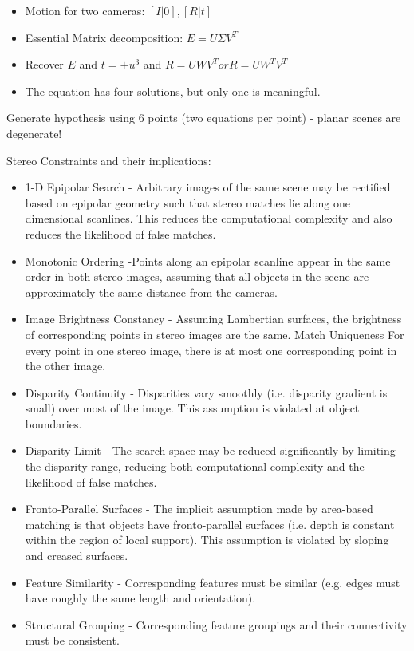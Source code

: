 \begin{enumerate}
\begin{itemize}
\item  Motion for two cameras: $[I|0], [R|t]$
\item Essential Matrix decomposition: $E= U \Sigma V^T$
\item Recover $E$ and $t = \pm u^3$ and $R=UWV^T or R=UW^TV^T$
\item The equation has four solutions, but only one is meaningful. 
\end{itemize}


Generate hypothesis using 6 points (two equations per point) - planar scenes are degenerate!

Stereo Constraints and their implications:
\begin{itemize}
\item 1-D Epipolar Search -  Arbitrary images of the same scene may be rectified based on epipolar geometry such that stereo matches lie along one dimensional scanlines. This reduces the computational complexity
and also reduces the likelihood of false matches.
\item Monotonic Ordering  -Points along an epipolar scanline appear in the same order in both stereo images, assuming that all objects in the scene are approximately the same distance from the cameras.
\item Image Brightness Constancy - Assuming Lambertian surfaces, the brightness of corresponding
points in stereo images are the same.
Match Uniqueness For every point in one stereo image, there is at most one corresponding point in the other image.
\item Disparity Continuity - Disparities vary smoothly (i.e. disparity gradient is small) over most of the image. This assumption is violated at object boundaries.
\item Disparity Limit - The search space may be reduced significantly by limiting the disparity range, reducing both computational complexity and the likelihood of false matches.
\item Fronto-Parallel Surfaces - The implicit assumption made by area-based matching is that objects have fronto-parallel surfaces (i.e. depth is constant within the region of local support). This assumption is violated by sloping and creased surfaces.
\item Feature Similarity - Corresponding features must be similar (e.g. edges must have roughly the same length and orientation).
\item Structural Grouping - Corresponding feature groupings and their connectivity must be consistent.
\end{itemize}


\end{enumerate}
